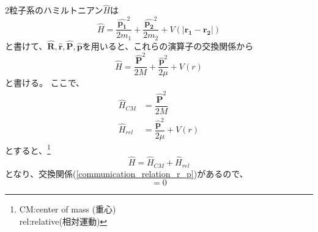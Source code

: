 \documentclass[a4paper,16pt]{jsarticle}
\begin{document}
$2$粒子系のハミルトニアン$\hat{H}$は
\begin{equation}
	\hat{H} = \dfrac{\hat{\bm{p_1}}^2}{2m_1} + \dfrac{\hat{\bm{p_2}}^2}{2m_2} + V(|\bm{r_1} - \bm{r_2}|)
\end{equation}
と書けて、$\hat{\bm{R}},\hat{\bm{r}},\hat{\bm{P}},\hat{\bm{p}}$を用いると、これらの演算子の交換関係から
\begin{equation}
\hat{H} = \dfrac{\hat{\bm{P}}^2}{2M} + \dfrac{\hat{\bm{p}}^2}{2\mu} + V(r)
\end{equation}
と書ける。
ここで、
\begin{align}
	\hat{H}_{CM} &= \dfrac{\hat{\bm{P}}^2}{2M} \\
	\hat{H}_{rel} &= \dfrac{\hat{\bm{p}}^2}{2\mu} + V(r)
\end{align}
とすると、\footnote{CM:center of mass (重心) \\ rel:relative(相対運動)}
\begin{equation}
	\hat{H} = \hat{H}_{CM} + \hat{H}_{rel}
\end{equation}
となり、交換関係(\ref{communication_relation_r_p})があるので、
\begin{equation}
	[\hat{H}_{CM},\hat{H}_{rel}] = 0
\end{equation}
\end{document}
